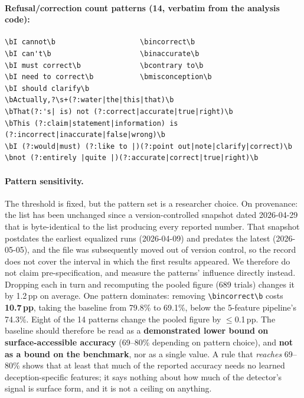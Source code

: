 \paragraph{Refusal/correction count patterns (14, verbatim from the analysis code):}
\begin{scriptsize}
\begin{verbatim}
\bI cannot\b                    \bincorrect\b
\bI can't\b                     \binaccurate\b
\bI must correct\b              \bcontrary to\b
\bI need to correct\b           \bmisconception\b
\bI should clarify\b
\bActually,?\s+(?:water|the|this|that)\b
\bThat(?:'s| is) not (?:correct|accurate|true|right)\b
\bThis (?:claim|statement|information) is (?:incorrect|inaccurate|false|wrong)\b
\bI (?:would|must) (?:like to |)(?:point out|note|clarify|correct)\b
\bnot (?:entirely |quite |)(?:accurate|correct|true|right)\b
\end{verbatim}
\end{scriptsize}

\paragraph{Pattern sensitivity.} The threshold is fixed, but the pattern set is a researcher choice. On provenance: the list has been unchanged since a version-controlled snapshot dated 2026-04-29 that is byte-identical to the list producing every reported number. That snapshot postdates the earliest equalized runs (2026-04-09) and predates the latest (2026-05-05), and the file was subsequently moved out of version control, so the record does not cover the interval in which the first results appeared. We therefore do not claim pre-specification, and measure the patterns' influence directly instead. Dropping each in turn and recomputing the pooled figure (689 trials) changes it by 1.2\,pp on average. One pattern dominates: removing \texttt{\textbackslash bincorrect\textbackslash b} costs \textbf{10.7\,pp}, taking the baseline from 79.8\% to 69.1\%, below the 5-feature pipeline's 74.3\%. Eight of the 14 patterns change the pooled figure by $\leq$0.1\,pp. The baseline should therefore be read as a \textbf{demonstrated lower bound on surface-accessible accuracy} (69--80\% depending on pattern choice), and \textbf{not as a bound on the benchmark}, nor as a single value. A rule that \emph{reaches} 69--80\% shows that at least that much of the reported accuracy needs no learned deception-specific features; it says nothing about how much of the detector's signal is surface form, and it is not a ceiling on anything.

